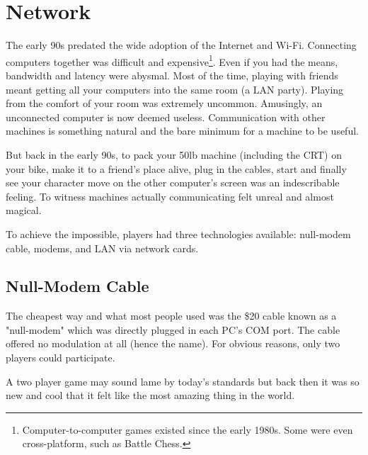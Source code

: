 \vspace{-15pt}
\section{Network}
The early 90s predated the wide adoption of the Internet and Wi-Fi. Connecting computers together was difficult and expensive\footnote{Computer-to-computer games existed since the early 1980s. Some were even cross-platform, such as Battle Chess.}. Even if you had the means, bandwidth and latency were abysmal. Most of the time, playing with friends meant getting all your computers into the same room (a LAN party). Playing from the comfort of your room was extremely uncommon. Amusingly, an unconnected computer is now deemed useless. Communication with other machines is something natural and the bare minimum for a machine to be useful.\\
\par
 But back in the early 90s, to pack your 50lb machine (including the CRT) on your bike, make it to a friend's place alive, plug in the cables, start \doom{} and finally see your character move on the other computer's screen was an indescribable feeling. To witness machines actually communicating felt unreal and almost magical.\\
\par 
To achieve the impossible, players had three technologies available: null-modem cable, modems, and LAN via network cards.









\subsection{Null-Modem Cable}
The cheapest way and what most people used was the \$20 cable known as a "null-modem" which was directly plugged in each PC's COM port. The cable offered no modulation at all (hence the name). For obvious reasons, only two players could participate.\\
\par 
{}
\par
 A two player game may sound lame by today's standards but back then it was so new and cool that it felt like the most amazing thing in the world.







